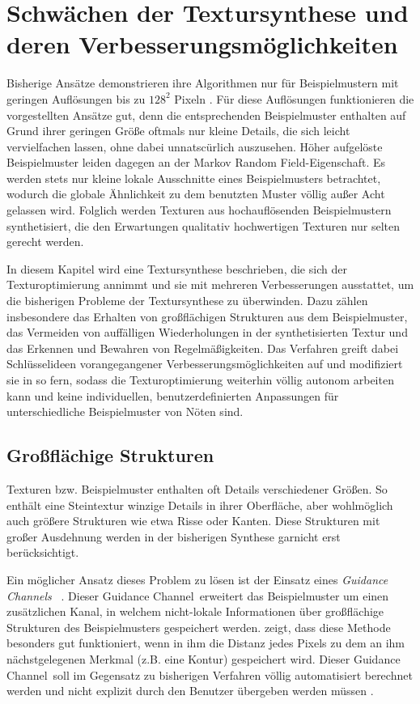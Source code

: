 \section{Schwächen der Textursynthese und deren Verbesserungsmöglichkeiten}

Bisherige Ansätze demonstrieren ihre Algorithmen nur für Beispielmustern mit geringen Auflösungen bis zu $128^2$ Pixeln \cite{SelfTuning}.
Für diese Auflösungen funktionieren die vorgestellten Ansätze gut, denn die entsprechenden Beispielmuster enthalten auf Grund ihrer geringen Größe oftmals nur kleine Details, die sich leicht vervielfachen lassen, ohne dabei unnatscürlich auszusehen.
Höher aufgelöste Beispielmuster leiden dagegen an der \glqq Markov Random Field\grqq -Eigenschaft.
Es werden stets nur kleine lokale Ausschnitte eines Beispielmusters betrachtet, wodurch die globale Ähnlichkeit zu dem benutzten Muster völlig außer Acht gelassen wird.
Folglich werden Texturen aus hochauflösenden Beispielmustern synthetisiert, die den Erwartungen qualitativ hochwertigen Texturen nur selten gerecht werden.

In diesem Kapitel wird eine Textursynthese beschrieben, die sich der Texturoptimierung annimmt und sie mit mehreren Verbesserungen ausstattet, um die bisherigen Probleme der Textursynthese zu überwinden.
Dazu zählen insbesondere das Erhalten von großflächigen Strukturen aus dem Beispielmuster, das Vermeiden von auffälligen Wiederholungen in der synthetisierten Textur und das Erkennen und Bewahren von Regelmäßigkeiten.
Das Verfahren greift dabei Schlüsselideen vorangegangener Verbesserungsmöglichkeiten auf und modifiziert sie in so fern, sodass die Texturoptimierung weiterhin völlig autonom arbeiten kann und keine individuellen, benutzerdefinierten Anpassungen für unterschiedliche Beispielmuster von Nöten sind.

\subsection{Großflächige Strukturen}

Texturen bzw. Beispielmuster enthalten oft Details verschiedener Größen.
So enthält eine Steintextur winzige Details in ihrer Oberfläche, aber wohlmöglich auch größere Strukturen wie etwa Risse oder Kanten.
Diese Strukturen mit großer Ausdehnung werden in der bisherigen Synthese garnicht erst berücksichtigt.

Ein möglicher Ansatz dieses Problem zu lösen ist der Einsatz eines \emph{\glqq Guidance Channels\grqq} \ \cite{SelfTuning}.
Dieser \glqq Guidance Channel\grqq \ erweitert das Beispielmuster um einen zusätzlichen Kanal, in welchem nicht-lokale Informationen über großflächige Strukturen des Beispielmusters gespeichert werden.
\cite{Guidance} zeigt, dass diese Methode besonders gut funktioniert, wenn in ihm die Distanz jedes Pixels zu dem an ihm nächstgelegenen Merkmal (z.B. eine Kontur)  gespeichert wird.
Dieser \glqq Guidance Channel\grqq \ soll im Gegensatz zu bisherigen Verfahren völlig automatisiert berechnet werden und nicht explizit durch den Benutzer übergeben werden müssen \cite{SelfTuning}.

